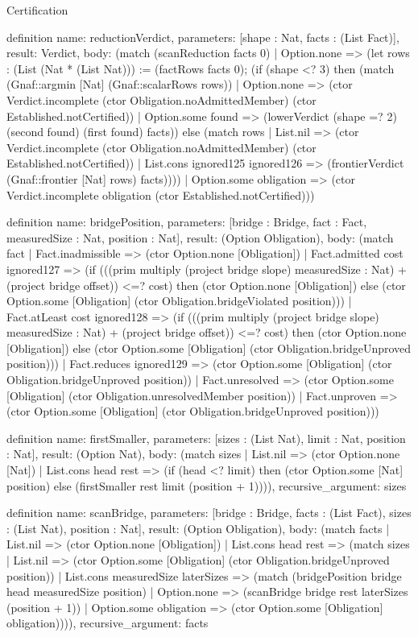 \begin{lexlean}{Certification}
\begin{semanticmodule}
definition{
  name: reductionVerdict,
  parameters: [shape : Nat, facts : (List Fact)],
  result: Verdict,
  body: (match (scanReduction facts 0)
    | Option.none => (let rows : (List (Nat * (List Nat))) := (factRows facts 0); (if (shape <? 3) then (match (Gnaf::argmin [Nat] (Gnaf::scalarRows rows))
      | Option.none => (ctor Verdict.incomplete (ctor Obligation.noAdmittedMember) (ctor Established.notCertified))
      | Option.some found => (lowerVerdict (shape =? 2) (second found) (first found) facts)) else (match rows
      | List.nil => (ctor Verdict.incomplete (ctor Obligation.noAdmittedMember) (ctor Established.notCertified))
      | List.cons ignored125 ignored126 => (frontierVerdict (Gnaf::frontier [Nat] rows) facts))))
    | Option.some obligation => (ctor Verdict.incomplete obligation (ctor Established.notCertified)))
}

definition{
  name: bridgePosition,
  parameters: [bridge : Bridge, fact : Fact, measuredSize : Nat, position : Nat],
  result: (Option Obligation),
  body: (match fact
    | Fact.inadmissible => (ctor Option.none [Obligation])
    | Fact.admitted cost ignored127 => (if (((prim multiply (project bridge slope) measuredSize : Nat) + (project bridge offset)) <=? cost) then (ctor Option.none [Obligation]) else (ctor Option.some [Obligation] (ctor Obligation.bridgeViolated position)))
    | Fact.atLeast cost ignored128 => (if (((prim multiply (project bridge slope) measuredSize : Nat) + (project bridge offset)) <=? cost) then (ctor Option.none [Obligation]) else (ctor Option.some [Obligation] (ctor Obligation.bridgeUnproved position)))
    | Fact.reduces ignored129 => (ctor Option.some [Obligation] (ctor Obligation.bridgeUnproved position))
    | Fact.unresolved => (ctor Option.some [Obligation] (ctor Obligation.unresolvedMember position))
    | Fact.unproven => (ctor Option.some [Obligation] (ctor Obligation.bridgeUnproved position)))
}

definition{
  name: firstSmaller,
  parameters: [sizes : (List Nat), limit : Nat, position : Nat],
  result: (Option Nat),
  body: (match sizes
    | List.nil => (ctor Option.none [Nat])
    | List.cons head rest => (if (head <? limit) then (ctor Option.some [Nat] position) else (firstSmaller rest limit (position + 1)))),
  recursive_argument: sizes
}

definition{
  name: scanBridge,
  parameters: [bridge : Bridge, facts : (List Fact), sizes : (List Nat), position : Nat],
  result: (Option Obligation),
  body: (match facts
    | List.nil => (ctor Option.none [Obligation])
    | List.cons head rest => (match sizes
      | List.nil => (ctor Option.some [Obligation] (ctor Obligation.bridgeUnproved position))
      | List.cons measuredSize laterSizes => (match (bridgePosition bridge head measuredSize position)
        | Option.none => (scanBridge bridge rest laterSizes (position + 1))
        | Option.some obligation => (ctor Option.some [Obligation] obligation)))),
  recursive_argument: facts
}


\end{semanticmodule}
\end{lexlean}
